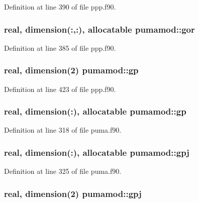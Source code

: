 \-Definition at line 390 of file ppp.\-f90.

\hypertarget{classpumamod_a40784d8720abb9ae62f1a66c0dbf666d}{
\subsubsection[{gor}]{\setlength{\rightskip}{0pt plus 5cm}real, dimension(\-:,\-:), allocatable {\bf pumamod\-::gor}}}
\label{classpumamod_a40784d8720abb9ae62f1a66c0dbf666d}


\-Definition at line 385 of file ppp.\-f90.

\hypertarget{classpumamod_ac97014556deaf23263381f8f385e24bf}{
\subsubsection[{gp}]{\setlength{\rightskip}{0pt plus 5cm}real, dimension(2) {\bf pumamod\-::gp}}}
\label{classpumamod_ac97014556deaf23263381f8f385e24bf}


\-Definition at line 423 of file ppp.\-f90.

\hypertarget{classpumamod_a6626db807402c61328ae36fddbeec5f1}{
\subsubsection[{gp}]{\setlength{\rightskip}{0pt plus 5cm}real, dimension(\-:), allocatable {\bf pumamod\-::gp}}}
\label{classpumamod_a6626db807402c61328ae36fddbeec5f1}


\-Definition at line 318 of file puma.\-f90.

\hypertarget{classpumamod_add5a9e2d129fa1c8bfe199f84263c9f7}{
\subsubsection[{gpj}]{\setlength{\rightskip}{0pt plus 5cm}real, dimension(\-:), allocatable {\bf pumamod\-::gpj}}}
\label{classpumamod_add5a9e2d129fa1c8bfe199f84263c9f7}


\-Definition at line 325 of file puma.\-f90.

\hypertarget{classpumamod_a7e9cb053d22629a087d9fb20373d6845}{
\subsubsection[{gpj}]{\setlength{\rightskip}{0pt plus 5cm}real, dimension(2) {\bf pumamod\-::gpj}}}
\label{classpumamod_a7e9cb053d22629a087d9fb20373d6845}


